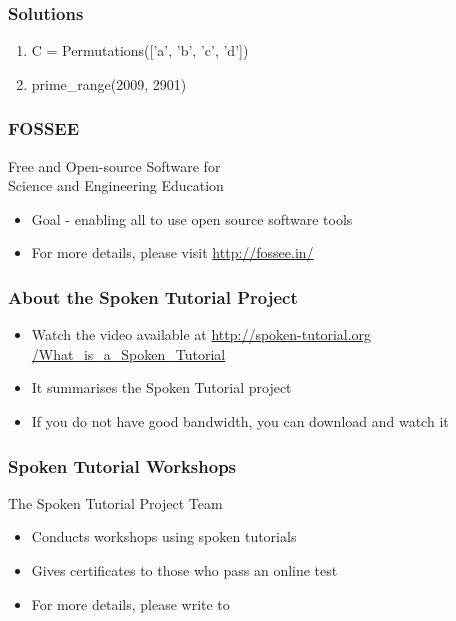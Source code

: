 \documentclass[17pt]{beamer}
\begin{document}
\begin{frame}
\frametitle{Solutions}
\begin{enumerate}
\item C = Permutations(['a', 'b', 'c', 'd'])
\item prime_range(2009, 2901)
\end{enumerate}
\end{frame}
\begin{frame}
\frametitle{FOSSEE}
{\color{blue}Free and Open-source Software for \\Science and Engineering Education} \\
\begin{itemize}
\item Goal - enabling all to use open source software tools
\item For more details, please visit {\color{blue}\url{http://fossee.in/}}
\end{itemize}
\end{frame}
\begin{frame}
\frametitle{About the Spoken Tutorial Project}
\begin{itemize}
\item Watch the video available at {\color{blue}\url{http://spoken-tutorial.org /What\_is\_a\_Spoken\_Tutorial}} 
\item It summarises the Spoken Tutorial project 
\item If you do not have good bandwidth, you can download and watch it
\end{itemize}
\end{frame}
\begin{frame}
\frametitle{Spoken Tutorial Workshops}The Spoken Tutorial Project Team 
\begin{itemize}
\item Conducts workshops using spoken tutorials 
\item Gives certificates to those who pass an online test 
\item For more details, please write to \\ 
\end{itemize}
\end{frame}
\end{document}
